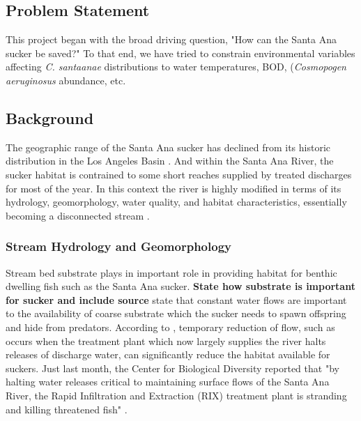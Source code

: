 \documentclass{article}\usepackage[]{graphicx}\usepackage[]{color}
\begin{document}
\subsection{Problem Statement}

This project began with the broad driving question, "How can the Santa Ana sucker be saved?" To that end, we have tried to constrain environmental variables affecting \emph{C. santaanae} distributions to water temperatures, BOD, (\emph{Cosmopogen aeruginosus} abundance, etc. 

\subsection{Background}

The geographic range of the Santa Ana sucker has declined from its historic distribution in the Los Angeles Basin \citep{brown2005aquatic, saiki2007life}. And within the Santa Ana River, the sucker habitat is contrained to some short reaches supplied by treated discharges for most of the year. In this context the river is highly modified in terms of its hydrology, geomorphology, water quality, and habitat characteristics, essentially becoming a disconnected stream \citep{poole2002fluvial}. 

\subsubsection{Stream Hydrology and Geomorphology}

Stream bed substrate plays in important role in providing habitat for benthic dwelling fish such as the Santa Ana sucker. \textbf{State how substrate is important for sucker and include source}\citet{baskerville2012recovery} state that constant water flows are important to the availability of coarse substrate which the sucker needs to spawn offspring and hide from predators. According to \citet{evans2005long}, temporary reduction of flow, such as occurs when the treatment plant which now largely supplies the river halts releases of discharge water, can significantly reduce the habitat available for suckers. Just last month, the Center for Biological Diversity reported that "by halting water releases critical to maintaining surface flows of the Santa Ana River, the Rapid Infiltration and Extraction (RIX) treatment plant is stranding and killing threatened fish" \citep{evans2005draft}. 
\end{document}
